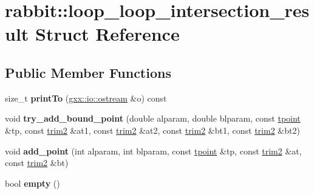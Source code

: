 \hypertarget{structrabbit_1_1loop__loop__intersection__result}{}\section{rabbit\+:\+:loop\+\_\+loop\+\_\+intersection\+\_\+result Struct Reference}
\label{structrabbit_1_1loop__loop__intersection__result}
\subsection*{Public Member Functions}
\begin{DoxyCompactItemize}
\item 
size\+\_\+t {\bfseries print\+To} (\hyperlink{classgxx_1_1io_1_1ostream}{gxx\+::io\+::ostream} \&o) const \hypertarget{structrabbit_1_1loop__loop__intersection__result_a3a66c8386397daa9be9134838d98e2b3}{}\label{structrabbit_1_1loop__loop__intersection__result_a3a66c8386397daa9be9134838d98e2b3}

\item 
void {\bfseries try\+\_\+add\+\_\+bound\+\_\+point} (double alparam, double blparam, const \hyperlink{structrabbit_1_1tpoint}{tpoint} \&tp, const \hyperlink{structrabbit_1_1trim2}{trim2} \&at1, const \hyperlink{structrabbit_1_1trim2}{trim2} \&at2, const \hyperlink{structrabbit_1_1trim2}{trim2} \&bt1, const \hyperlink{structrabbit_1_1trim2}{trim2} \&bt2)\hypertarget{structrabbit_1_1loop__loop__intersection__result_a6506ce9bcfdcf13d0cd767d996446a87}{}\label{structrabbit_1_1loop__loop__intersection__result_a6506ce9bcfdcf13d0cd767d996446a87}

\item 
void {\bfseries add\+\_\+point} (int alparam, int blparam, const \hyperlink{structrabbit_1_1tpoint}{tpoint} \&tp, const \hyperlink{structrabbit_1_1trim2}{trim2} \&at, const \hyperlink{structrabbit_1_1trim2}{trim2} \&bt)\hypertarget{structrabbit_1_1loop__loop__intersection__result_af6d5536d5cd2e3bdc3a0dd385ac378b2}{}\label{structrabbit_1_1loop__loop__intersection__result_af6d5536d5cd2e3bdc3a0dd385ac378b2}

\item 
bool {\bfseries empty} ()\hypertarget{structrabbit_1_1loop__loop__intersection__result_ad0688ea4093a187f5a370da4e1fa1a47}{}\label{structrabbit_1_1loop__loop__intersection__result_ad0688ea4093a187f5a370da4e1fa1a47}

\end{DoxyCompactItemize}
